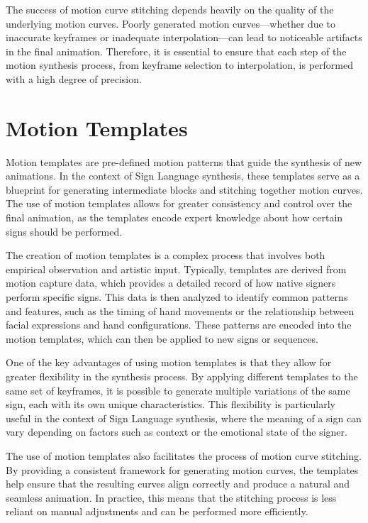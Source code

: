 \documentclass[../../main.tex]{subfiles}
\begin{document}
The success of motion curve stitching depends heavily on the quality of the underlying motion curves. Poorly generated motion curves—whether due to inaccurate keyframes or inadequate interpolation—can lead to noticeable artifacts in the final animation. Therefore, it is essential to ensure that each step of the motion synthesis process, from keyframe selection to interpolation, is performed with a high degree of precision.

\section{Motion Templates}

Motion templates are pre-defined motion patterns that guide the synthesis of new animations. In the context of Sign Language synthesis, these templates serve as a blueprint for generating intermediate blocks and stitching together motion curves. The use of motion templates allows for greater consistency and control over the final animation, as the templates encode expert knowledge about how certain signs should be performed.

The creation of motion templates is a complex process that involves both empirical observation and artistic input. Typically, templates are derived from motion capture data, which provides a detailed record of how native signers perform specific signs. This data is then analyzed to identify common patterns and features, such as the timing of hand movements or the relationship between facial expressions and hand configurations. These patterns are encoded into the motion templates, which can then be applied to new signs or sequences.

One of the key advantages of using motion templates is that they allow for greater flexibility in the synthesis process. By applying different templates to the same set of keyframes, it is possible to generate multiple variations of the same sign, each with its own unique characteristics. This flexibility is particularly useful in the context of Sign Language synthesis, where the meaning of a sign can vary depending on factors such as context or the emotional state of the signer.

The use of motion templates also facilitates the process of motion curve stitching. By providing a consistent framework for generating motion curves, the templates help ensure that the resulting curves align correctly and produce a natural and seamless animation. In practice, this means that the stitching process is less reliant on manual adjustments and can be performed more efficiently.
\end{document}
